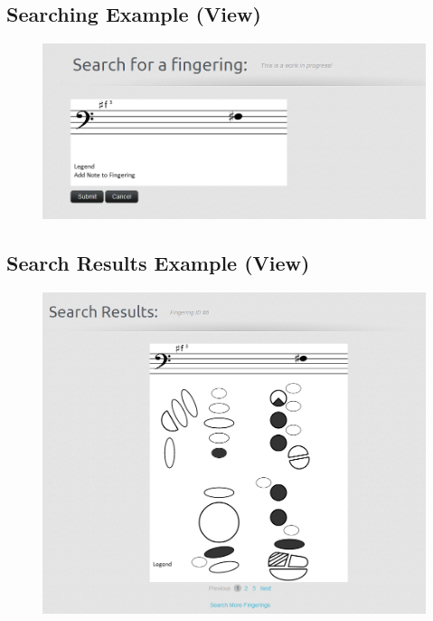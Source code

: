 \documentclass[12pt,english]{article}
\begin{document}
\subsection{Searching Example (View)}

\begin{figure}[H]
\caption{}


\begin{centering}
\includegraphics[scale=0.5]{search_example}
\par\end{centering}

\end{figure}



\subsection{Search Results Example (View)}

\begin{figure}[H]
\caption{}


\begin{centering}
\includegraphics[scale=0.45]{search_results_example}
\par\end{centering}

\end{figure}
\end{document}
